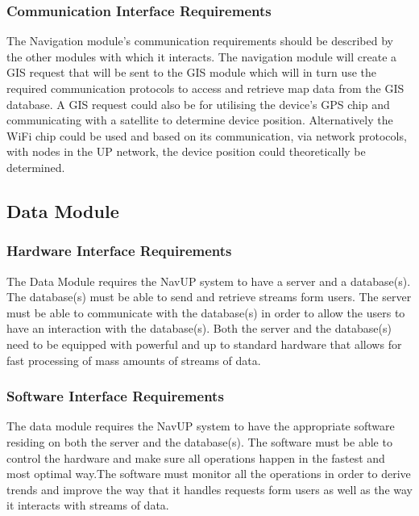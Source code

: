 \documentclass[11pt]{article}
\begin{document}
 \subsubsection{Communication Interface Requirements}
  
The Navigation module’s communication requirements should be described by the other modules with which it interacts. The navigation module will create a GIS request that will be sent to the GIS module which will in turn use the required communication protocols to access and retrieve map data from the GIS database. A GIS request could also be for utilising the device’s GPS chip and communicating with a satellite to determine device position. Alternatively the WiFi chip could be used and based on its communication, via network protocols, with nodes in the UP network, the device position could theoretically be determined.

\subsection{Data Module}

\subsubsection{Hardware Interface Requirements}

The Data Module requires the NavUP system to have a server and a database(s). The database(s) must be able to send and retrieve streams form users. The server must be able to communicate with the database(s) in order to allow the users to have an interaction with the database(s).
Both the server and the database(s) need to be equipped with powerful and up to standard hardware that allows for fast processing of mass amounts of streams of data.

\subsubsection{Software Interface Requirements}

The data module requires the NavUP system to have the appropriate software residing on both the server and the database(s). The software must be able to control the hardware and make sure all operations happen in the fastest and most optimal way.The software must monitor all the operations in order to derive trends and improve the way that it handles requests form users as well as the way it interacts with streams of data.
\end{document}
